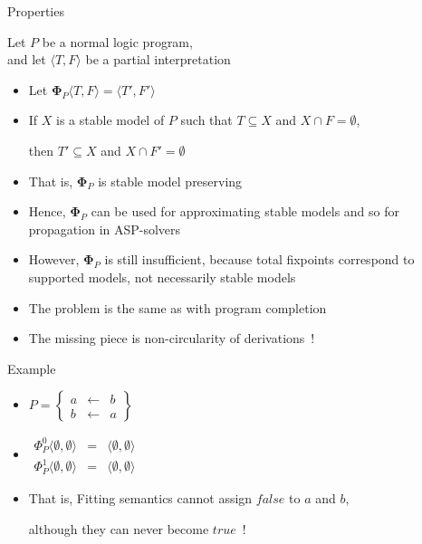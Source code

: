 \begin{frame}{Properties}

  Let $P$ be a normal logic program,\\ and
  let $\langle T,F \rangle$ be a partial interpretation

  \begin{itemize}
  \item<1-> Let ${\mathbf{\Phi}}_P\langle T,F \rangle=\langle T',F'\rangle$
  \item<2-> If $X$ is a stable model of $P$ such that $T\subseteq X$ and $X\cap F=\emptyset$,
    \par then $T'\subseteq X$ and $X\cap F'=\emptyset$
  \item<3-> [] That is, ${\mathbf{\Phi}}_P$ is \alert{stable model preserving}
  \item<3-> [] Hence, ${\mathbf{\Phi}}_P$ can be used for approximating stable models
    and so for propagation in ASP-solvers
    \medskip
  \item <4-> However, ${\mathbf{\Phi}}_P$ is still insufficient, because total fixpoints
    correspond to supported models, not necessarily stable models
  \item<5-> []  The problem is the same as with program completion
  \item<6-> [] The missing piece is non-circularity of derivations~!
  \end{itemize}
\end{frame}
\begin{frame}{Example}
  \bigskip
  \begin{itemize}
  \item<1-> []
    \(
    P
    =
    \left\{
      \begin{array}{lcl}
        a &\leftarrow & b \\
        b &\leftarrow & a
      \end{array}
    \right\}
    \)
    \bigskip
  \item<2-> []
    \(
    \begin{array}{lcl}
      \Phi_P^0\langle \emptyset,\emptyset\rangle &=&\langle \emptyset,\emptyset\rangle\\
      \Phi_P^1\langle \emptyset,\emptyset\rangle &=&\langle \emptyset,\emptyset\rangle
    \end{array}
    \)
    \bigskip
  \item<3-> That is, Fitting semantics cannot assign $\mathit{false}$ to $a$ and $b$,

    although they can never become $\mathit{true}$~!
  \end{itemize}
\end{frame}
%
